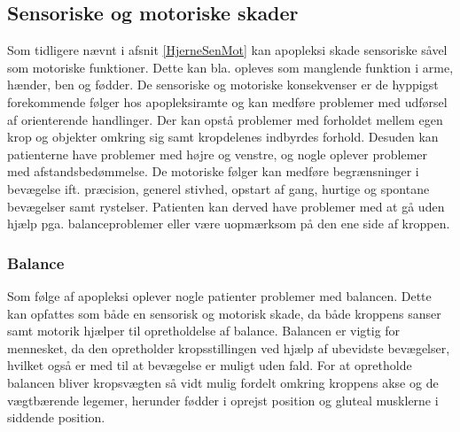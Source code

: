 \subsection{Sensoriske og motoriske skader} %
Som tidligere nævnt i afsnit \ref{HjerneSenMot} kan apopleksi skade sensoriske såvel som motoriske funktioner. Dette kan bla. opleves som manglende funktion i arme, hænder, ben og fødder. De sensoriske og motoriske konsekvenser er de hyppigst forekommende følger hos apopleksiramte og kan medføre problemer med udførsel af orienterende handlinger. Der kan opstå problemer med forholdet mellem egen krop og objekter omkring sig samt kropdelenes indbyrdes forhold. Desuden kan patienterne have problemer med højre og venstre, og nogle oplever problemer med afstandsbedømmelse. De motoriske følger kan medføre  begrænsninger i bevægelse ift. præcision, generel stivhed, opstart af gang, hurtige og spontane bevægelser samt rystelser. Patienten kan derved have problemer med at gå uden hjælp pga. balanceproblemer eller være uopmærksom på den ene side af kroppen. \cite{Sundhed.dk,DSfA2009}

\subsubsection{Balance}
Som følge af apopleksi oplever nogle patienter problemer med balancen. Dette kan opfattes som både en sensorisk og motorisk skade, da både kroppens sanser samt motorik hjælper til opretholdelse af balance. Balancen er vigtig for mennesket, da den opretholder kropsstillingen ved hjælp af ubevidste bevægelser, hvilket også er med til at bevægelse er muligt uden fald. For at opretholde balancen bliver kropsvægten så vidt mulig fordelt omkring kroppens akse og de vægtbærende legemer, herunder fødder i oprejst position og gluteal musklerne i siddende position.\cite{Nichols1997}

